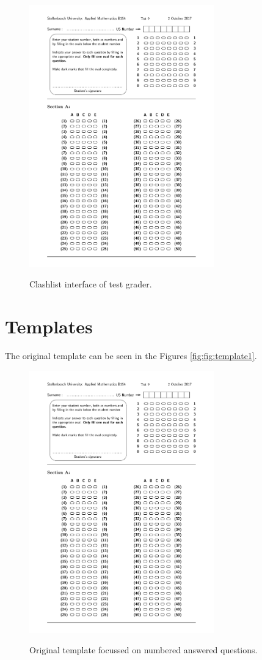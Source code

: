 \begin{figure}
  \centering
  \includegraphics[width=8cm]{clashInterface}\\
  \caption{Clashlist interface of test grader.}
  \label{fig:clashInterface}
\end{figure}

\section{Templates}

The original template can be seen in the Figures \ref{fig:fig:template1}. 

\begin{figure}
  \centering
  \includegraphics[width=8cm]{template1}\\
  \caption{Original template focussed on numbered answered questions.}
  \label{fig:template1}
\end{figure}

